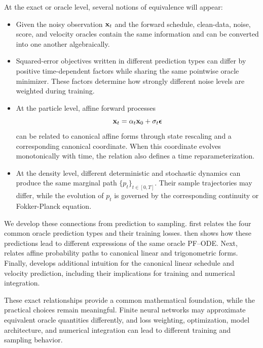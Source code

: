 At the exact or oracle level, several notions of equivalence will appear:
\begin{itemize}
    \item {}
    Given the noisy observation ${\mathbf{x}}_t$ and the forward schedule, clean-data,
    noise, score, and velocity oracles contain the same information and can be
    converted into one another algebraically.
    
    \item {}
    Squared-error objectives written in different prediction types can differ by
    positive time-dependent factors while sharing the same pointwise oracle
    minimizer. These factors determine how strongly different noise levels are
    weighted during training.
    
    \item {}
    At the particle level, affine forward processes
    \[
    {\mathbf{x}}_t=\alpha_t{\mathbf{x}}_0+\sigma_t{\bm{\epsilon}}
    \]
    can be related to canonical affine forms through state rescaling and a
    corresponding canonical coordinate. When this coordinate evolves
    monotonically with time, the relation also defines a time reparameterization.
    
    \item {}
    At the density level, different deterministic and stochastic dynamics can
    produce the same marginal path $\{p_t\}_{t\in[0,T]}$. Their sample
    trajectories may differ, while the evolution of $p_t$ is governed by the
    corresponding continuity or Fokker-Planck equation.
\end{itemize}
We develop these connections from prediction to sampling.
 first relates the four common oracle prediction
types and their training losses.
 then shows how these predictions lead to
different expressions of the same oracle PF--ODE.
Next,  relates affine probability paths to
canonical linear and trigonometric forms.
Finally,  develops additional intuition for
the canonical linear schedule and velocity prediction, including their
implications for training and numerical integration.


These exact relationships provide a common mathematical foundation, while
the practical choices remain meaningful. Finite neural networks may
approximate equivalent oracle quantities differently, and loss weighting,
optimization, model architecture, and numerical integration can lead to
different training and sampling behavior.




